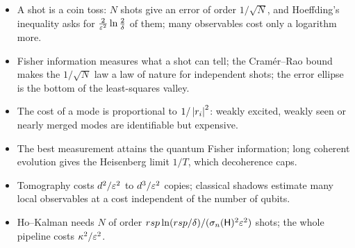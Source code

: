 \documentclass[handoutsbeamer.tex]{subfiles}
\begin{document}
\begin{frame}
\begin{itemize}\setlength\itemsep{0.3em}
    \item A shot is a coin toss: $N$ shots give an error of order $1/\sqrt N$, and Hoeffding's inequality asks for $\frac{2}{\varepsilon^2}\ln\frac2\delta$ of them; many observables cost only a logarithm more.
    \item Fisher information measures what a shot can tell; the Cram\'er--Rao bound makes the $1/\sqrt N$ law a law of nature for independent shots; the error ellipse is the bottom of the least-squares valley.
    \item The cost of a mode is proportional to $1/\left\lvert r_i \right\rvert^2$: weakly excited, weakly seen or nearly merged modes are identifiable but expensive.
    \item The best measurement attains the quantum Fisher information; long coherent evolution gives the Heisenberg limit $1/T$, which decoherence caps.
    \item Tomography costs $d^2/\varepsilon^2$ to $d^3/\varepsilon^2$ copies; classical shadows estimate many local observables at a cost independent of the number of qubits.
    \item Ho--Kalman needs $N$ of order $rsp\ln(rsp/\delta)/(\sigma_n(\mathsf{H})^2\varepsilon^2)$ shots; the whole pipeline costs $\kappa^2/\varepsilon^2$.
\end{itemize}
\end{frame}
\end{document}
